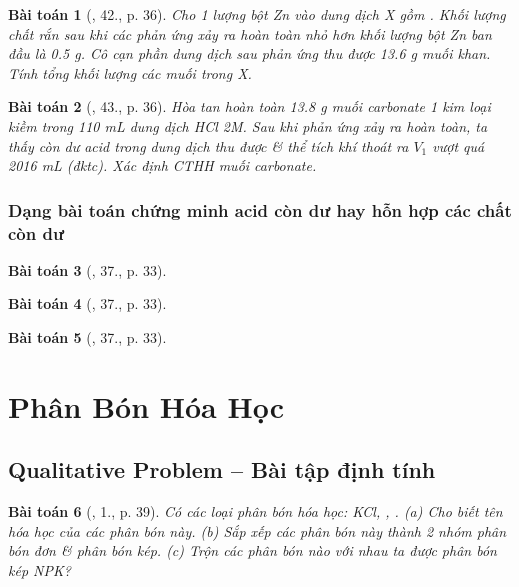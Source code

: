 \documentclass{article}
\newtheorem{baitoan}{Bài toán}
\begin{document}
\begin{baitoan}[\cite{An_350_BT_Hoa_Hoc_9}, 42., p. 36]
	Cho 1 lượng bột \emph{Zn} vào dung dịch X gồm \emph{}. Khối lượng chất rắn sau khi các phản ứng xảy ra hoàn toàn nhỏ hơn khối lượng bột \emph{Zn} ban đầu là \emph{0.5 g}. Cô cạn phần dung dịch sau phản ứng thu được \emph{13.6 g} muối khan. Tính tổng khối lượng các muối trong X.
\end{baitoan}

\begin{baitoan}[\cite{An_350_BT_Hoa_Hoc_9}, 43., p. 36]
	Hòa tan hoàn toàn \emph{13.8 g} muối carbonate 1 kim loại kiềm \emph{} trong \emph{110 mL} dung dịch \emph{HCl 2M}. Sau khi phản ứng xảy ra hoàn toàn, ta thấy còn dư acid trong dung dịch thu được \& thể tích khí thoát ra $V_1$ vượt quá \emph{2016 mL} (đktc). Xác định CTHH muối carbonate.
\end{baitoan}

\subsubsection{Dạng bài toán chứng minh acid còn dư hay hỗn hợp các chất còn dư}

\begin{baitoan}[\cite{An_350_BT_Hoa_Hoc_9}, 37., p. 33]
	
\end{baitoan}

\begin{baitoan}[\cite{An_350_BT_Hoa_Hoc_9}, 37., p. 33]
	
\end{baitoan}

\begin{baitoan}[\cite{An_350_BT_Hoa_Hoc_9}, 37., p. 33]
	
\end{baitoan}


\section{Phân Bón Hóa Học}

\subsection{Qualitative Problem -- Bài tập định tính}

\begin{baitoan}[\cite{SGK_Hoa_Hoc_9}, 1., p. 39]
	Có các loại phân bón hóa học: \emph{KCl, , }. (a) Cho biết tên hóa học của các phân bón này. (b) Sắp xếp các phân bón này thành 2 nhóm phân bón đơn \& phân bón kép. (c) Trộn các phân bón nào với nhau ta được phân bón kép NPK?
\end{baitoan}
\end{document}
